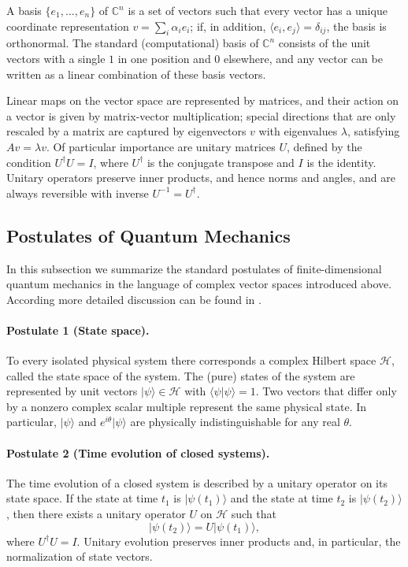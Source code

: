 \documentclass[12pt,a4paper,openany]{report}
\let\textcite\citet
\begin{document}
A basis $\{e_1,\dots,e_n\}$ of $\mathbb{C}^n$ is a set of vectors such that every vector has a unique coordinate representation $v = \sum_i \alpha_i e_i$; if, in addition, $\langle e_i,e_j\rangle = \delta_{ij}$, the basis is orthonormal. The standard (computational) basis of $\mathbb{C}^n$ consists of the unit vectors with a single $1$ in one position and $0$ elsewhere, and any vector can be written as a linear combination of these basis vectors.

Linear maps on the vector space are represented by matrices, and their action on a vector is given by matrix-vector multiplication; special directions that are only rescaled by a matrix are captured by eigenvectors $v$ with eigenvalues $\lambda$, satisfying $Av = \lambda v$. Of particular importance are unitary matrices $U$, defined by the condition $U^\dagger U = I$, where $U^\dagger$ is the conjugate transpose and $I$ is the identity. Unitary operators preserve inner products, and hence norms and angles, and are always reversible with inverse $U^{-1} = U^\dagger$.


\subsection{Postulates of Quantum Mechanics}


In this subsection we summarize the standard postulates of finite-dimensional quantum mechanics in the language of complex vector spaces introduced above. According more detailed discussion can be found in \textcite[Chapter~2]{nielsen_chuang_qcqi}.

\paragraph{Postulate 1 (State space).}
To every isolated physical system there corresponds a complex Hilbert space $\mathcal{H}$, called the state space of the system. The (pure) states of the system are represented by unit vectors $\lvert \psi \rangle \in \mathcal{H}$ with $\langle \psi \vert \psi \rangle = 1$. Two vectors that differ only by a nonzero complex scalar multiple represent the same physical state. In particular, $\lvert \psi \rangle$ and $e^{i\theta} \lvert \psi \rangle$ are physically indistinguishable for any real $\theta$.

\paragraph{Postulate 2 (Time evolution of closed systems).}
The time evolution of a closed system is described by a unitary operator on its state space. If the state at time $t_1$ is $\lvert \psi(t_1) \rangle$ and the state at time $t_2$ is $\lvert \psi(t_2) \rangle$, then there exists a unitary operator $U$ on $\mathcal{H}$ such that
\begin{equation}
  \lvert \psi(t_2) \rangle = U \lvert \psi(t_1) \rangle,
\end{equation}
where $U^\dagger U = I$. Unitary evolution preserves inner products and, in particular, the normalization of state vectors.
\end{document}
